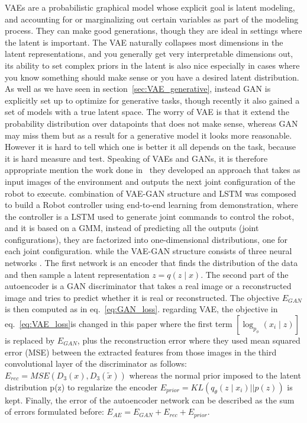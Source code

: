 VAEs are a probabilistic graphical model whose explicit goal is latent modeling, and accounting for or marginalizing out certain variables as part of the modeling process. They can make good generations, though they are ideal in settings where the latent is important. The VAE naturally collapses most dimensions in the latent representations, and you generally get very interpretable dimensions out, its ability to set complex priors in the latent is also nice especially in cases where you know something should make sense or you have a desired latent distribution. As well as we have seen in section~\ref{sec:VAE_generative}, instead GAN is explicitly set up to optimize for generative tasks, though recently it also gained a set of models with a true latent space. The worry of VAE is that it extend the probability distribution over datapoints that does not make sense, whereas GAN may miss them but as a result for a generative model it looks more reasonable. However it is hard to tell which one is better it all depends on the task, because it is hard measure and test. Speaking of VAEs and GANs, it is therefore appropriate mention the work done in~\cite{rahmatizadeh2018vision} they developed an approach that takes as input images of the environment and outputs the next joint configuration of the robot to execute. combination of VAE-GAN structure and LSTM was composed to build a Robot controller using end-to-end learning from demonstration, where the controller is a LSTM used to generate joint commands to control the robot, and it is based on a GMM, instead of predicting all the outputs (joint configurations), they are factorized into one-dimensional distributions, one for each joint configuration. while the VAE-GAN structure consists of three neural networks . The first network is an encoder that finds the distribution of the data and then sample a latent representation $z=q(z\mid x)$. The second part of the autoencoder is a GAN discriminator that takes a real image or a reconstructed image and tries to predict whether it is real or reconstructed. The objective $E_{GAN}$ is then computed as in eq.~\ref{eq:GAN_loss}. regarding VAE, the objective in eq.~\ref{eq:VAE_loss}is changed  in this paper where the first term $[\log_{p_\phi}(x_i \mid z)]$ is replaced by $E_{GAN}$, plus the reconstruction error where they used mean squared error (MSE) between the extracted features from those images in the third convolutional layer of the discriminator as follows: $E_{rec} = MSE(D_3(x), D_3(\tilde{x} ))$ whereas the normal prior imposed to the latent distribution p(z) to regularize the encoder $E_{prior}=KL(q_\theta (z\mid x_i)||p(z))$ is kept. Finally, the error of the autoencoder network can be described as the sum of errors formulated before: $E_{AE} = E_{GAN}+ E_{rec} + E_{prior}$.\\
